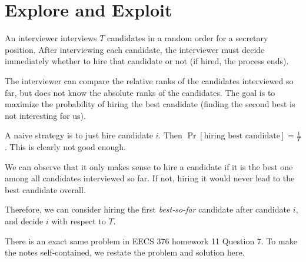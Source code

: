 \chapter {Explore and Exploit}

\begin{question}
  An interviewer interviews $T$ candidates in a random order for a secretary position. After interviewing each candidate, the interviewer must decide immediately whether to hire that candidate or not (if hired, the process ends).

  The interviewer can compare the relative ranks of the candidates interviewed so far, but does not know the absolute ranks of the candidates. The goal is to maximize the probability of hiring the best candidate (finding the second best is not interesting for us).
\end{question}

A naive strategy is to just hire candidate $i$. Then $\Pr[\text{hiring best candidate}] = \frac{1}{T}$. This is clearly not good enough.

\begin{remark}
  We can observe that it only makes sense to hire a candidate if it is the best one among all candidates interviewed so far. If not, hiring it would never lead to the best candidate overall.
\end{remark}

Therefore, we can consider hiring the first \textit{best-so-far} candidate after candidate $i$, and decide $i$ with respect to $T$.

There is an exact same problem in EECS 376 homework 11 Question 7. To make the notes self-contained, we restate the problem and solution here.

